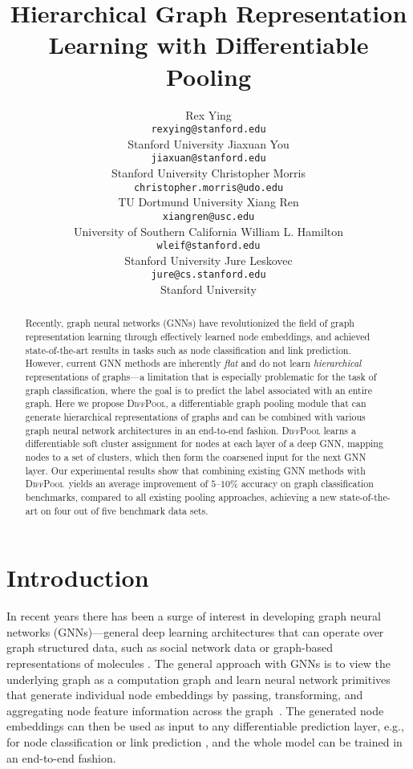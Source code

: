\documentclass{article}
\title{Hierarchical Graph Representation Learning with Differentiable Pooling}
\author{
Rex Ying\\
\texttt{rexying@stanford.edu} \\
Stanford University
\And 
Jiaxuan You\\
\texttt{jiaxuan@stanford.edu} \\
Stanford University
\And 
Christopher Morris \\
\texttt{christopher.morris@udo.edu} \\
TU Dortmund University
\And 
Xiang Ren\\
\texttt{xiangren@usc.edu} \\
University of Southern California
\And 
William L. Hamilton\\
\texttt{wleif@stanford.edu} \\
Stanford University
\And
Jure Leskovec\\
\texttt{jure@cs.stanford.edu} \\
Stanford University
}
\newcommand{\name}{\textsc{DiffPool}\xspace}
\begin{document}
\maketitle


\begin{abstract}
Recently, graph neural networks (GNNs) have revolutionized the field of graph representation learning through effectively learned node embeddings, and achieved state-of-the-art results in tasks such as node classification and link prediction. However, current GNN methods are inherently {\em flat} and do not learn {\em hierarchical} representations of graphs---a limitation that is especially problematic for the task of graph classification, where the goal is to predict the label associated with an entire graph.
Here we propose \name, a differentiable graph pooling module that can generate hierarchical representations of graphs and can be combined with various graph neural network architectures in an end-to-end fashion. 
\name learns a differentiable soft cluster assignment for nodes at each layer of a deep GNN, mapping nodes to a set of clusters, which then form the coarsened input for the next GNN layer.
Our experimental results show that combining existing GNN methods with \name\ yields an average improvement of $5$--$10\%$ accuracy on graph classification benchmarks, compared to all existing pooling approaches, achieving a new state-of-the-art on four out of five benchmark data sets.   
\end{abstract}
%
 \section{Introduction}
\label{sec:intro}
In recent years there has been a surge of interest in developing graph neural networks (GNNs)---general deep learning architectures that can operate over graph structured data, such as social network data \cite{hamilton2017inductive,kipf2017semi,Vel+2018} or graph-based representations of molecules \cite{dai2016discriminative,Duv+2015,Gil+2017}.
The general approach with GNNs is to view the underlying graph as a computation graph and learn neural network primitives that generate individual node embeddings by passing, transforming, and aggregating node feature information across the graph~\cite{Gil+2017,hamilton2017inductive}.
The generated node embeddings can then be used as input to any differentiable prediction layer, e.g., for node classification \cite{hamilton2017inductive} or link prediction \cite{Sch+2017}, and the whole model can be trained in an end-to-end fashion. 
\end{document}
